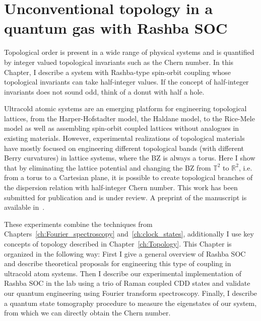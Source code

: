 
\renewcommand{\thechapter}{8}

\chapter{Unconventional topology in a quantum gas with Rashba SOC}
\label{ch:Rashba}

Topological order is present in a wide range of physical systems and is quantified by integer valued topological invariants such as the Chern number. In this Chapter, I describe a system with Rashba-type spin-orbit coupling whose topological invariants can take half-integer values. If the concept of half-integer invariants does not sound odd, think of a donut with half a hole. 

Ultracold atomic systems are an emerging platform for engineering topological lattices, from the Harper-Hofstadter model\cite{miyake_realizing_2013,aidelsburger_realization_2013}, the Haldane model\cite{jotzu_experimental_2014}, to the Rice-Mele model\cite{lu_geometrical_2016,lohse_thouless_2016} as well as assembling spin-orbit coupled lattices without analogues in existing materials\cite{wu_realization_2016,sun_highly_2018}. However, experimental realizations of topological materials have mostly focused on engineering different topological bands (with different Berry curvatures) in lattice systems, where the BZ is always a torus. Here I show that by eliminating the lattice potential and changing the BZ from ${\mathbb T}^2$ to ${\mathbb R}^2$, i.e. from a torus to a Cartesian plane, it is possible to create topological branches of the dispersion relation with half-integer Chern number. This work has been submitted for publication and is under review. A preprint of the manuscript is available in~\cite{valdes-curiel_unconventional_2019}. %

These experiments combine the techniques from Chapters~\ref{ch:Fourier_spectroscopy} and~\ref{ch:clock_states}, additionally I use key concepts of topology described in Chapter~\ref{ch:Topology}. This Chapter is organized in the following way: First I give a general overview of Rashba SOC and describe theoretical proposals for engineering this type of coupling in ultracold atom systems. Then I describe our experimental implementation of Rashba SOC in the lab using a trio of Raman coupled CDD states and validate our quantum engineering using Fourier transform spectroscopy. Finally, I describe a quantum state tomography procedure to measure the eigenstates of our system, from which we can directly obtain the Chern number. 

